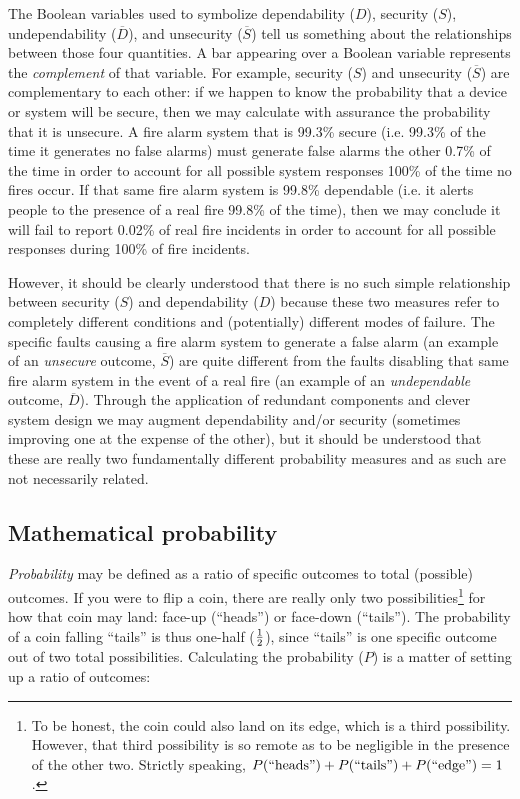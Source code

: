 The Boolean variables used to symbolize dependability ($D$), security ($S$), undependability ($\overline{D}$), and unsecurity ($\overline{S}$) tell us something about the relationships between those four quantities.  A bar appearing over a Boolean variable represents the \textit{complement} of that variable.  For example, security ($S$) and unsecurity ($\overline{S}$) are complementary to each other: if we happen to know the probability that a device or system will be secure, then we may calculate with assurance the probability that it is unsecure.  A fire alarm system that is 99.3\% secure (i.e. 99.3\% of the time it generates no false alarms) must generate false alarms the other 0.7\% of the time in order to account for all possible system responses 100\% of the time no fires occur.  If that same fire alarm system is 99.8\% dependable (i.e. it alerts people to the presence of a real fire 99.8\% of the time), then we may conclude it will fail to report 0.02\% of real fire incidents in order to account for all possible responses during 100\% of fire incidents.        

However, it should be clearly understood that there is no such simple relationship between security ($S$) and dependability ($D$) because these two measures refer to completely different conditions and (potentially) different modes of failure.  The specific faults causing a fire alarm system to generate a false alarm (an example of an \textit{unsecure} outcome, $\overline{S}$) are quite different from the faults disabling that same fire alarm system in the event of a real fire (an example of an \textit{undependable} outcome, $\overline{D}$).  Through the application of redundant components and clever system design we may augment dependability and/or security (sometimes improving one at the expense of the other), but it should be understood that these are really two fundamentally different probability measures and as such are not necessarily related.









\filbreak
\subsection{Mathematical probability}

\textit{Probability} may be defined as a ratio of specific outcomes to total (possible) outcomes.  If you were to flip a coin, there are really only two possibilities\footnote{To be honest, the coin could also land on its edge, which is a third possibility.  However, that third possibility is so remote as to be negligible in the presence of the other two.  Strictly speaking, $P(\hbox{``heads''}) + P(\hbox{``tails''}) + P(\hbox{``edge''}) = 1$.} for how that coin may land: face-up (``heads'') or face-down (``tails'').  The probability of a coin falling ``tails'' is thus one-half ($1 \over 2$), since ``tails'' is one specific outcome out of two total possibilities.  Calculating the probability ($P$) is a matter of setting up a ratio of outcomes:  

